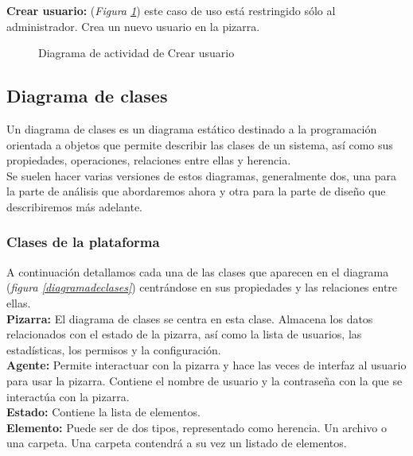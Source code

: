 \textbf{Crear usuario:} (\emph{Figura \ref{fig:crearUsuario}}) este caso de uso está restringido sólo al administrador. Crea un nuevo usuario en la pizarra.

\begin{figure}[H]
\centering
\crearUsuario
\caption{Diagrama de actividad de Crear usuario}
\label{fig:crearUsuario}
\end{figure}
\newpage

\subsection{Diagrama de clases}
Un diagrama de clases es un diagrama estático destinado a la programación orientada a objetos que permite describir las clases de un sistema, así como sus propiedades, operaciones, relaciones entre ellas y herencia.\\

Se suelen hacer varias versiones de estos diagramas, generalmente dos, una para la parte de análisis que abordaremos ahora y otra para la parte de diseño que describiremos más adelante.\\

\subsubsection{Clases de la plataforma}
A continuación detallamos cada una de las clases que aparecen en el diagrama (\emph{figura \ref{diagramadeclases}}) centrándose en sus propiedades y las relaciones entre ellas.\\

\textbf{Pizarra:} El diagrama de clases se centra en esta clase. Almacena los datos relacionados con el estado de la pizarra, así como la lista de usuarios, las estadísticas, los permisos y la configuración.\\

\textbf{Agente:} Permite interactuar con la pizarra y hace las veces de interfaz al usuario para usar la pizarra. Contiene el nombre de usuario y la contraseña con la que se interactúa con la pizarra.\\

\textbf{Estado:} Contiene la lista de elementos.\\

\textbf{Elemento:} Puede ser de dos tipos, representado como herencia. Un archivo o una carpeta. Una carpeta contendrá a su vez un listado de elementos.\\

